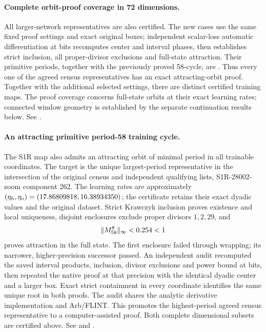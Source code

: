 \documentclass[11pt,letterpaper]{article}
\begin{document}
\paragraph{Complete orbit-proof coverage in 72 dimensions.}
All \nCensusSeventyTwo{} larger-network representatives are also certified.
The \nCensusSeventyTwoNew{} new cases use the same fixed proof settings and exact original boxes;
independent scalar-loss automatic differentiation at \nCensusThirteenPrecision{} bits recomputes
\nCensusADPhases{} center and interval phases, then establishes strict inclusion, all proper-divisor
exclusions and full-state attraction. Their primitive periods, together with the previously proved
58-cycle, are \tCensusSeventyTwoPeriods{}. Thus every one of the \nCensusAll{} agreed census
representatives has an exact attracting-orbit proof. Together with the additional selected settings,
there are \nCertifiedOrbits{} distinct certified training maps. The proof coverage concerns full-state
orbits at their exact learning rates; connected window geometry is established by the separate
continuation results below. See .

\paragraph{An attracting primitive period-58 training cycle.}
The S1R map also admits an attracting orbit of minimal period \nPFiftyEightPeriod{} in all
\nPFiftyEightDimension{} trainable coordinates. The target is the unique largest-period representative
in the intersection of the original census and independent qualifying lists, S1R-28002-zoom component 262.
The learning rates are approximately $(\eta_h,\eta_o)=(17.86809818,16.38934350)$;
the certificate retains their exact dyadic values and the original dataset. Strict Krawczyk inclusion
proves existence and local uniqueness, disjoint enclosures exclude proper divisors $1,2,29$, and
\begin{equation}
\|M_{58}^{8}\|_\infty<0.254<1
\end{equation}
proves attraction in the full state. The first enclosure failed through wrapping; its narrower,
higher-precision successor passed. An independent audit recomputed the saved interval products,
inclusion, divisor exclusions and power bound at \nPFiftyEightPrecision{} bits, then repeated the
native proof at that precision with the identical dyadic center and a larger box. Exact strict
containment in every coordinate identifies the same unique root in both proofs. The audit shares
the analytic derivative implementation and Arb/FLINT. This promotes the highest-period agreed census representative to a computer-assisted proof. Both complete dimensional subsets are certified above. See
 and
.
\end{document}
